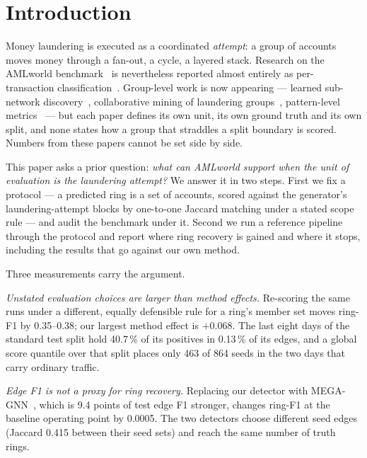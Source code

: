 \section{Introduction}
\label{sec:intro}

Money laundering is executed as a coordinated \emph{attempt}: a group of accounts moves money
through a fan-out, a cycle, a layered stack. Research on the AMLworld
benchmark~\citep{altman2023} is nevertheless reported almost entirely as per-transaction
classification~\citep{egressy2024,lin2024fraudgt,bilgi2024}. Group-level work is now
appearing --- learned sub-network discovery~\citep{chai2023,rico2026}, collaborative mining of
laundering groups~\citep{tian2025}, pattern-level metrics~\citep{tariq2026redirect} --- but
each paper defines its own unit, its own ground truth and its own split, and none states how a
group that straddles a split boundary is scored. Numbers from these papers cannot be set side
by side.

This paper asks a prior question: \emph{what can AMLworld support when the unit of evaluation
is the laundering attempt?} We answer it in two steps. First we fix a protocol --- a predicted
ring is a set of accounts, scored against the generator's laundering-attempt blocks by
one-to-one Jaccard matching under a stated scope rule --- and audit the benchmark under it.
Second we run a reference pipeline through the protocol and report where ring recovery is
gained and where it stops, including the results that go against our own method.

Three measurements carry the argument.

\emph{Unstated evaluation choices are larger than method effects.} Re-scoring the same runs
under a different, equally defensible rule for a ring's member set moves ring-F1 by
0.35--0.38; our largest method effect is $+0.068$.
The last eight days of the standard test split hold 40.7\,\% of its positives in 0.13\,\% of
its edges, and a global score quantile over that split places only 463 of 864 seeds in the two
days that carry ordinary traffic.

\emph{Edge F1 is not a proxy for ring recovery.} Replacing our detector with
MEGA-GNN~\citep{bilgi2024}, which is 9.4 points of test edge F1 stronger, changes ring-F1 at
the baseline operating point by 0.0005. The two detectors choose different seed edges (Jaccard
0.415 between their seed sets) and reach the same number of truth rings.

